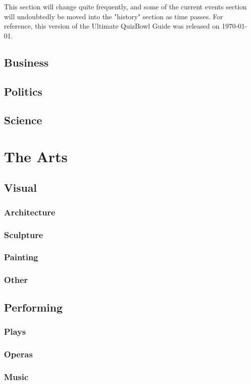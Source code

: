 \documentclass[12pt]{book}
\begin{document}
		This section will change quite frequently, and some of the current events section will undoubtedly be moved into the "history" section as time passes.  For reference, this version of the Ultimate QuizBowl Guide was released on \today. 
				
	\section{Business}
	\section{Politics}
	\section{Science}

\chapter{The Arts}
	\section{Visual}
		\subsection{Architecture}
		\subsection{Sculpture}
		\subsection{Painting}
		\subsection{Other}

	\section{Performing}
		\subsection{Plays}
		\subsection{Operas}
		\subsection{Music}
\end{document}
